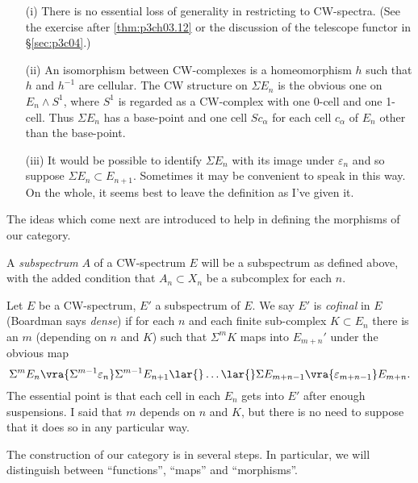 \documentclass[../main]{subfiles}
\begin{document}
\begin{notes}
    \begin{enumerate}
    \item[(i)]   There is no essential loss of generality in restricting to CW-spectra. (See the exercise after \ref{thm:p3ch03.12} or the discussion of the telescope functor in \S\ref{sec:p3c04}.)
    \item[(ii)]  An isomorphism between CW-complexes is a homeomorphism $h$ such that $h$ and $h^{-1}$ are cellular. The CW structure on $\Sigma   E_n$ is the obvious one on $E_n\wedge S^1$, where $S^1$ is regarded as a CW-complex with one 0-cell and one 1-cell. Thus $\Sigma   E_n$ has a base-point and one cell $Sc_\alpha$ for each cell $c_\alpha$ of $E_n$ other than the base-point.
    \item[(iii)] It would be possible to identify $\Sigma   E_n$ with its image under $\varepsilon_n$ and so suppose $\Sigma   E_n\subset E_{n+1}$. Sometimes it may be convenient to speak in this way. On the whole, it seems best to leave the definition as I've given it.
    \end{enumerate}
\end{notes}

The ideas which come next are introduced to help in defining the morphisms of our category.

A \emph{subspectrum} $A$ of a CW-spectrum $E$ will be a subspectrum as defined above, with the added condition that $A_n\subset X_n$ be a subcomplex for each $n$.

Let $E$ be a CW-spectrum, $E'$ a subspectrum of $E$. We say $E'$ is \emph{cofinal} in $E$ (Boardman says \emph{dense}) if for each $n$ and each finite sub-complex $K\subset E_n$ there is an $m$ (depending on $n$ and $K$) such that $\Sigma  ^mK$ maps into $E_{m+n}'$ under the obvious map
\[
\Sigma  ^mE_n
\vra{\Sigma  ^{m-1}\varepsilon_n}
\Sigma  ^{m-1}E_{n+1}
\lar{}
\hdots
\lar{}
\Sigma   E_{m+n-1}
\vra{\varepsilon_{m+n-1}}
E_{m+n}.
\]
The essential point is that each cell in each $E_n$ gets into $E'$ after enough suspensions. I said that $m$ depends on $n$ and $K$, but there is no need to suppose that it does so in any particular way.

The construction of our category is in several steps. In particular, we will distinguish between ``functions'', ``maps'' and ``morphisms''.
\end{document}
